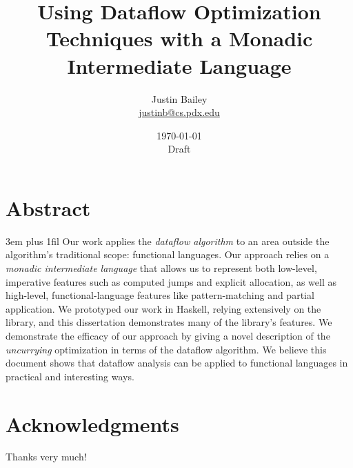 \dodocclass



\date{\today \\Draft}
\author{Justin Bailey \\ \url{justinb@cs.pdx.edu}}
\title{Using Dataflow Optimization Techniques with a Monadic Intermediate Language}
\maketitle 

\pagestyle{plain}
\section*{Abstract}
{%
\parfillskip 3em plus 1fil%
Our work applies the \emph{dataflow algorithm} to an area outside the
algorithm's traditional scope: functional languages. Our approach
relies on a \emph{monadic intermediate language} that allows us to
represent both low-level, imperative features such as computed jumps
and explicit allocation, as well as high-level, functional-language
features like pattern-matching and partial application. We prototyped
our work in Haskell, relying extensively on the \hoopl library, and
this dissertation demonstrates many of the library's features. We
demonstrate the efficacy of our approach by giving a novel description
of the \emph{uncurrying} optimization in terms of the dataflow
algorithm. We believe this document shows that dataflow analysis can
be applied to functional languages in practical and interesting
ways.\par}
\newpage

\section*{Acknowledgments}
Thanks very much!
\newpage

\singlespacing
\tableofcontents
\newpage
{}
\listoffigures
\newpage

